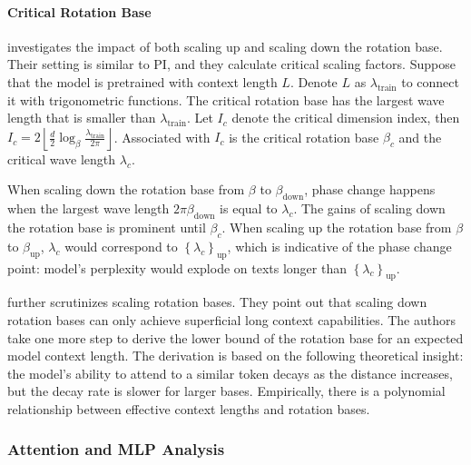 \documentclass[11pt, a4paper, logo, copyright, nonumbering]{map}
\begin{document}
\paragraph{Critical Rotation Base}
\citet{liu2023scaling} investigates the impact of both scaling up and scaling down the rotation base. Their setting is similar to PI, and they calculate critical scaling factors. Suppose that the model is pretrained with context length \(L\). Denote \(L\) as \(\lambda_{\text{train}}\) to connect it with trigonometric functions. The critical rotation base has the largest wave length that is smaller than \(\lambda_{\text{train}}\). Let \(I_{c}\) denote the critical dimension index, then \(I_{c} = 2\left\lfloor \frac{d}{2}\log_{\beta}\frac{\lambda_{\text{train}}}{2\pi} \right\rfloor\). Associated with \(I_{c}\) is the critical rotation base \(\beta_{c}\) and the critical wave length \(\lambda_{c}\).

When scaling down the rotation base from \(\beta\) to \(\beta_{\text{down}}\), phase change happens when the largest wave length \(2\pi \beta_{\text{down}}\) is equal to \(\lambda_{c}\). The gains of scaling down the rotation base is prominent until \(\beta_{c}\). When scaling up the rotation base from \(\beta\) to \(\beta_{\text{up}}\), \(\lambda_{c}\) would correspond to \(\left\{ \lambda_{c} \right\}_{\text{up}} \), which is indicative of the phase change point: model's perplexity would explode on texts longer than \(\left\{ \lambda_{c} \right\}_{\text{up}} \).

\citet{men2024baseropeboundscontext} further scrutinizes scaling rotation bases. They point out that scaling down rotation bases can only achieve superficial long context capabilities. The authors take one more step to derive the lower bound of the rotation base for an expected model context length. The derivation is based on the following theoretical insight: the model's ability to attend to a similar token decays as the distance increases, but the decay rate is slower for larger bases. Empirically, there is a polynomial relationship between effective context lengths and rotation bases.















\subsubsection{Attention and MLP Analysis}
\end{document}
